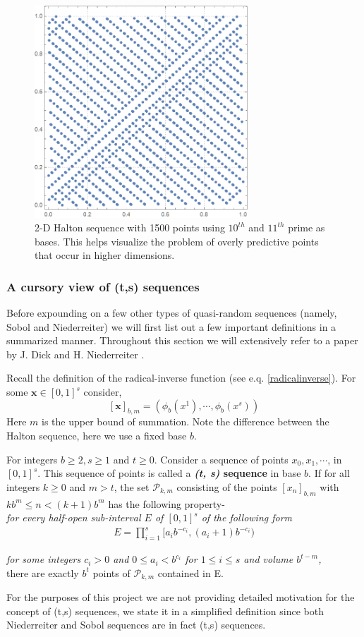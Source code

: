 \documentclass[12pt]{article}
\numberwithin{equation}{section}
\begin{document}
\begin{figure}[!htb]
    \centering
    \includegraphics[width=8cm]{Images/1011halton.png}
    \caption{2-D Halton sequence with 1500 points using $10^{th}$ and $11^{th}$ prime as bases. This helps visualize the problem of overly predictive points that occur in higher dimensions.}
    \label{fig:example1011halton}
\end{figure}
\clearpage
\subsubsection{A cursory view of (t,s) sequences}

Before expounding on a few other types of quasi-random sequences (namely, Sobol and Niederreiter) we will first list out a few important definitions in a summarized manner. Throughout this section we will extensively refer to a paper by J. Dick and H. Niederreiter \cite{exactnied}.
\par Recall the definition of the radical-inverse function (see e.q. \ref{radicalinverse}). For some $\mathbf{x} \in [0,1]^s$ consider, $$[\mathbf{x}]_{b, m}=(\phi_b(x^1), \cdots, \phi_b(x^s))$$ Here $m$ is the upper bound of summation. Note the difference between the Halton sequence, here we use a fixed base $b$.
\par For integers $b\geq 2, s\geq 1$ and $t \geq 0$. Consider a sequence of points $x_0, x_1, \cdots$, in $[0,1]^s$. This sequence of points is called a \textbf{\textit{(t, s)} sequence} in base $b$. If for all integers $k\geq0$ and $m > t$, the set $\mathcal{P}_{k,m}$ consisting of the points $[x_n]_{b,m}$ with $kb^m \leq n < (k+1)b^m$ has the following property-
\\
\textit{for every half-open sub-interval $E$ of $[0,1]^s$ of the following form}
\begin{align}
    E= \prod_{i=1}^s [a_i b^{-c_i}, (a_i+1)b^{-c_i}) \label{elementary}
\end{align}
\par \textit{for some integers $c_i>0$ and $0\leq a_i < b^{c_i}$ for $1\leq i \leq s$ and volume $b^{t-m}$,}\\
there are exactly $b^t$ points of $\mathcal{P}_{k,m}$ contained in E.
\par For the purposes of this project we are not providing detailed motivation for the concept of (t,s) sequences, we state it in a simplified definition since both Niederreiter and Sobol sequences are in fact (t,s) sequences.
\end{document}
